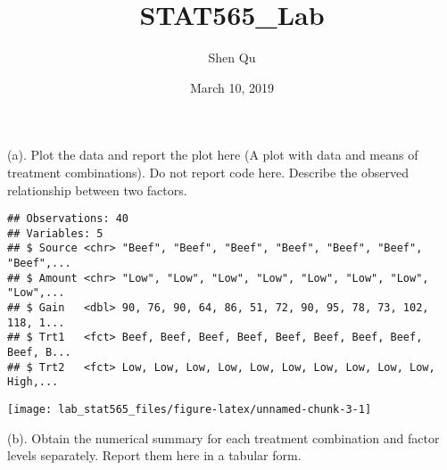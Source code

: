 \documentclass[]{article}
\title{STAT565\_Lab}
\author{Shen Qu}
\date{March 10, 2019}
\begin{document}
\maketitle

(a).
\textcolor[rgb]{0.5,0.5,0.5}{Plot the data and report the plot here (A plot with data and means of treatment combinations). Do not report code here. Describe the observed relationship between two factors.}

\begin{verbatim}
## Observations: 40
## Variables: 5
## $ Source <chr> "Beef", "Beef", "Beef", "Beef", "Beef", "Beef", "Beef",...
## $ Amount <chr> "Low", "Low", "Low", "Low", "Low", "Low", "Low", "Low",...
## $ Gain   <dbl> 90, 76, 90, 64, 86, 51, 72, 90, 95, 78, 73, 102, 118, 1...
## $ Trt1   <fct> Beef, Beef, Beef, Beef, Beef, Beef, Beef, Beef, Beef, B...
## $ Trt2   <fct> Low, Low, Low, Low, Low, Low, Low, Low, Low, Low, High,...
\end{verbatim}

\texttt{[image: lab\_stat565\_files/figure-latex/unnamed-chunk-3-1]}

(b).
\textcolor[rgb]{0.5,0.5,0.5}{Obtain the numerical summary for each treatment combination and factor levels separately. Report them here in a tabular form.}
\end{document}
